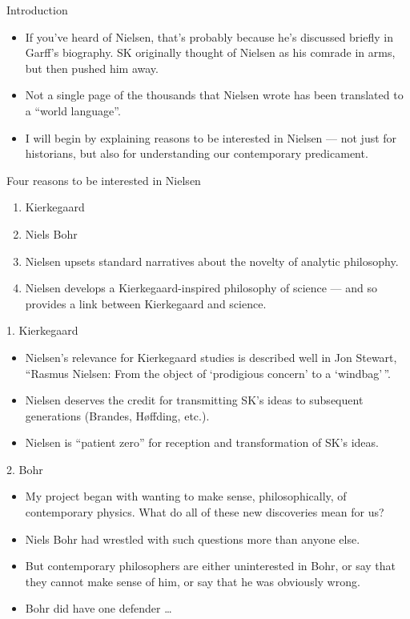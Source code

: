 \documentclass[ignorenonframetext, ]{beamer}
\begin{document}
\begin{frame}{Introduction}
  
  \begin{itemize}
  \item If you've heard of Nielsen, that's probably because he's
    discussed briefly in Garff's biography. SK originally thought of
    Nielsen as his comrade in arms, but then pushed him away.
  \item Not a single page of the thousands that Nielsen wrote has been
    translated to a ``world language''.
  \item I will begin by explaining reasons to be interested in Nielsen
    --- not just for historians, but also for understanding our
    contemporary predicament.
\end{itemize}

\end{frame}

\begin{frame}{Four reasons to be interested in Nielsen}

\begin{enumerate}
\item Kierkegaard
\item Niels Bohr
\item Nielsen upsets standard narratives about the novelty of analytic
  philosophy.
\item Nielsen develops a Kierkegaard-inspired philosophy of science
  --- and so provides a link between Kierkegaard and science.
\end{enumerate}

\end{frame}

\begin{frame}{1. Kierkegaard}
  
\begin{itemize}
\item Nielsen's relevance for Kierkegaard studies is described well in
  Jon Stewart, ``Rasmus Nielsen: From the object of `prodigious
  concern' to a `windbag'\,''.
\item Nielsen deserves the credit for transmitting SK's ideas to
  subsequent generations (Brandes, Høffding, etc.).
\item Nielsen is ``patient zero'' for reception and transformation of
  SK's ideas.
\end{itemize}  
\end{frame}


\begin{frame}{2. Bohr}
  \begin{itemize}
\item My project began with wanting to make sense, philosophically, of
  contemporary physics. What do all of these new discoveries mean for
  us?
\item Niels Bohr had wrestled with such questions more than anyone
  else.
\item But contemporary philosophers are either uninterested in Bohr,
  or say that they cannot make sense of him, or say that he was
  obviously wrong.
\item Bohr did have one defender \dots 
\end{itemize}
\end{frame}
\end{document}
